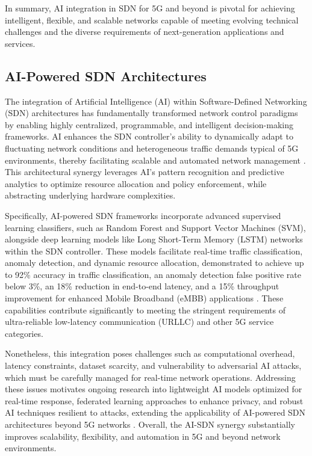 \documentclass[sigconf]{acmart}
\begin{document}
In summary, AI integration in SDN for 5G and beyond is pivotal for achieving intelligent, flexible, and scalable networks capable of meeting evolving technical challenges and the diverse requirements of next-generation applications and services.

\subsection{AI-Powered SDN Architectures}

The integration of Artificial Intelligence (AI) within Software-Defined Networking (SDN) architectures has fundamentally transformed network control paradigms by enabling highly centralized, programmable, and intelligent decision-making frameworks. AI enhances the SDN controller’s ability to dynamically adapt to fluctuating network conditions and heterogeneous traffic demands typical of 5G environments, thereby facilitating scalable and automated network management \cite{ref52}. This architectural synergy leverages AI’s pattern recognition and predictive analytics to optimize resource allocation and policy enforcement, while abstracting underlying hardware complexities.

Specifically, AI-powered SDN frameworks incorporate advanced supervised learning classifiers, such as Random Forest and Support Vector Machines (SVM), alongside deep learning models like Long Short-Term Memory (LSTM) networks within the SDN controller. These models facilitate real-time traffic classification, anomaly detection, and dynamic resource allocation, demonstrated to achieve up to 92\% accuracy in traffic classification, an anomaly detection false positive rate below 3\%, an 18\% reduction in end-to-end latency, and a 15\% throughput improvement for enhanced Mobile Broadband (eMBB) applications \cite{ref52}. These capabilities contribute significantly to meeting the stringent requirements of ultra-reliable low-latency communication (URLLC) and other 5G service categories.

Nonetheless, this integration poses challenges such as computational overhead, latency constraints, dataset scarcity, and vulnerability to adversarial AI attacks, which must be carefully managed for real-time network operations. Addressing these issues motivates ongoing research into lightweight AI models optimized for real-time response, federated learning approaches to enhance privacy, and robust AI techniques resilient to attacks, extending the applicability of AI-powered SDN architectures beyond 5G networks \cite{ref52}. Overall, the AI-SDN synergy substantially improves scalability, flexibility, and automation in 5G and beyond network environments.
\end{document}
